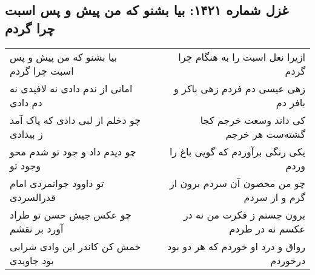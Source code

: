 \begin{center}
\section*{غزل شماره ۱۴۲۱: بیا بشنو که من پیش و پس اسبت چرا گردم}
\label{sec:1421}
\begin{longtable}{l p{0.5cm} r}
بیا بشنو که من پیش و پس اسبت چرا گردم
&&
ازیرا نعل اسبت را به هنگام چرا گردم
\\
امانی از ندم دادی نه لافیدی نه دم دادی
&&
زهی عیسی دم فردم زهی باکر و بافر دم
\\
چو دخلم از لبی دادی که پاک آمد ز بیدادی
&&
کی داند وسعت خرجم کجا گشته‌ست هر خرجم
\\
چو دیدم داد و جود تو شدم محو وجود تو
&&
یکی رنگی برآوردم که گویی باغ را وردم
\\
تو داوود جوانمردی امام قدرالسردی
&&
چو من محصون آن سردم برون از گرم و از سردم
\\
چو عکس جیش حسن تو طراد آورد بر نقشم
&&
برون جستم ز فکرت من نه در عکسم نه در طردم
\\
خمش کن کاندر این وادی شرابی بود جاویدی
&&
رواق و درد او خوردم که هر دو بود درخوردم
\\
\end{longtable}
\end{center}
